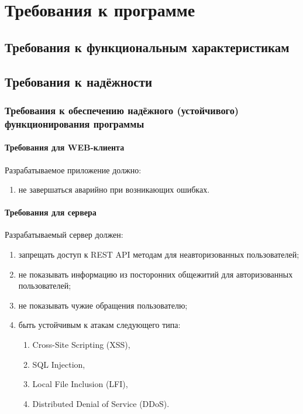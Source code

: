 \section{Требования к программе}

\subsection{Требования к функциональным характеристикам}



\subsection{Требования к надёжности}

\subsubsection{Требования к обеспечению надёжного (устойчивого) функционирования программы}

\paragraph{Требования для WEB-клиента}
Разрабатываемое приложение должно:
\begin{enumerate}
    \item не завершаться аварийно при возникающих ошибках.
\end{enumerate}

\paragraph{Требования для сервера}
Разрабатываемый сервер должен:
\begin{enumerate}
    \item запрещать доступ к REST API методам для неавторизованных пользователей;
    \item не показывать информацию из посторонних общежитий для авторизованных пользователей;
    \item не показывать чужие обращения пользователю;
    \item быть устойчивым к атакам следующего типа:
    \begin{enumerate}
        \item Cross-Site Scripting (XSS),
        \item SQL Injection,
        \item Local File Inclusion (LFI),
        \item Distributed Denial of Service (DDoS).
    \end{enumerate}
\end{enumerate}

